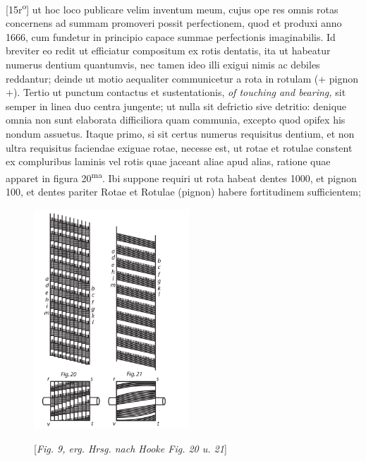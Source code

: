 [15r\textsuperscript{o}] ut hoc loco publicare velim inventum meum, cujus ope res omnis rotas concernens ad summam promoveri possit perfectionem, quod et produxi anno 1666, cum fundetur in principio capace summae perfectionis imaginabilis. Id breviter eo redit ut efficiatur compositum ex rotis dentatis, ita ut habeatur numerus dentium quantumvis, nec tamen ideo illi exigui nimis ac debiles reddantur; deinde ut motio aequaliter communicetur a rota in rotulam (+ pignon +). Tertio ut punctum contactus et sustentationis, \textit{of touching and bearing,} sit semper in linea duo centra jungente;  ut nulla sit defrictio sive detritio: denique omnia non sunt elaborata difficiliora quam communia, excepto quod opifex his nondum assuetus. Itaque primo, si sit certus numerus requisitus dentium, 
et non ultra requisitus faciendae exiguae rotae, necesse est, ut rotae et rotulae constent ex compluribus laminis vel rotis quae jaceant aliae apud alias, ratione quae apparet in figura 20\textsuperscript{ma}. Ibi suppone requiri ut rota habeat dentes 1000, et pignon 100, 
et dentes pariter Rotae et Rotulae (pignon) habere fortitudinem sufficientem;
\pend
\newpage
\pstart \noindent 
\begin{figure}    
\vspace{-6mm}                
\includegraphics[trim = 0mm -2mm -5mm 0mm, clip, width=0.52\textwidth]{images/LH0351506_014-dext20u22.pdf}\\
\rule[0pt]{0mm}{0pt}[\textit{Fig. 9, erg. Hrsg. nach Hooke Fig. 20 u. 21}]
\end{figure}
